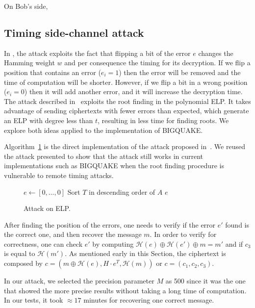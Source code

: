 On Bob's side, 

\subsection{Timing side-channel attack}
In \cite{shoufan2009timing}, the attack exploits the fact that flipping a bit of the error $e$ changes the Hamming weight $w$ and per consequence the timing for its decryption. If we flip a position that contains an error ($e_i = 1$) then the error will be removed and the time of computation will be shorter. However, if we flip a bit in a wrong position ($e_i = 0$) then it will add another error, and it will increase the decryption time. The attack described in~\cite{bucerzan2017improved} exploits the root finding in the polynomial ELP. It takes advantage of sending ciphertexts with fewer errors than expected, which generate an ELP with degree less than $t$, resulting in less time for finding roots. We explore both ideas applied to the implementation of BIGQUAKE.

Algorithm~\ref{alg:attack:1} is the direct implementation of the attack proposed in~\cite{shoufan2009timing}. We reused the attack presented to show that the attack still works in current implementations such as BIGQUAKE when the root finding procedure is vulnerable to remote timing attacks.

\begin{figure}
\centering
\begin{algorithm}[H]
 $e \gets [0,\ldots,0]$\;
Sort $T$ in descending order of $A$\;
\Return $e$\;
 \caption{Attack on ELP.}
  \label{alg:attack:1}
\end{algorithm}
\end{figure}

After finding the position of the errors, one needs to verify if the error $e'$ found is the correct one, and then recover the message $m$. In order to verify for correctness, one can check $e'$ by computing $\mathcal{H}(e) \oplus \mathcal{H}(e') \oplus m = m'$ and if $c_3$ is equal to $\mathcal{H}(m')$. As mentioned early in this Section, the ciphertext is composed by $c = (m\oplus\mathcal{H}(e), H\cdot e^T, \mathcal{H}(m))$ or $c = (c_1, c_2, c_3)$.

In our attack, we selected the precision parameter $M$ as 500 since it was the one that showed the more precise results without taking a long time of computation.  In our tests, it took $\approx17$ minutes for recovering one correct message.